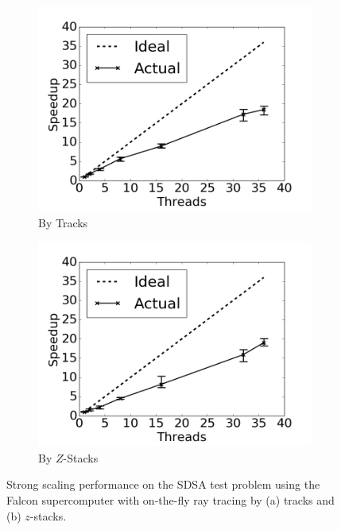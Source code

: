\begin{figure}[h!]
	\centering
	\begin{subfigure}{0.48\textwidth}
		\centering
		\includegraphics[width=\linewidth]{figures/results/performance/fs-parallel-scaling-tracks.png}
		\caption{By Tracks}
		\label{fig:rt-parallel-fs-tracks}
	\end{subfigure}
	\begin{subfigure}{0.48\textwidth}
		\centering
		\includegraphics[width=\linewidth]{figures/results/performance/fs-parallel-scaling-stacks.png}
		\caption{By $Z$-Stacks}
		\label{fig:rt-parallel-fs-stacks}
	\end{subfigure}
	\caption[]{Strong scaling performance on the SDSA test problem using the Falcon supercomputer with on-the-fly ray tracing by (a) tracks and (b) $z$-stacks.}
	\label{fig:rt-parallel-fs}
\end{figure}

